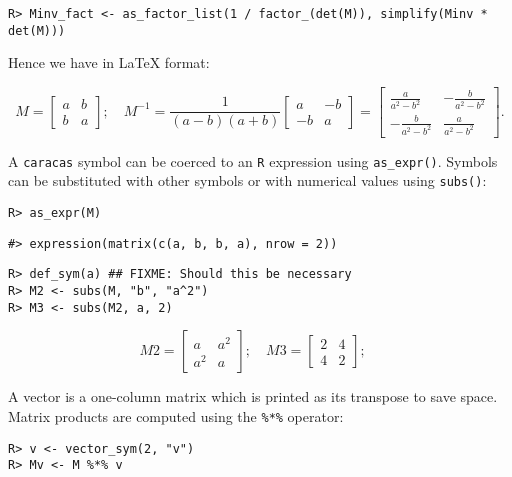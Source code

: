 \begin{verbatim}
R> Minv_fact <- as_factor_list(1 / factor_(det(M)), simplify(Minv * det(M)))
\end{verbatim}

Hence we have in LaTeX format:

\[
M = \left[\begin{matrix}a & b\\b & a\end{matrix}\right]; \quad M^{-1} = \frac{1}{\left(a - b\right) \left(a + b\right)}  \left[\begin{matrix}a & - b\\- b & a\end{matrix}\right] = \left[\begin{matrix}\frac{a}{a^{2} - b^{2}} & - \frac{b}{a^{2} - b^{2}}\\- \frac{b}{a^{2} - b^{2}} & \frac{a}{a^{2} - b^{2}}\end{matrix}\right] .
\]

A \texttt{caracas} symbol can be coerced to an \texttt{R} expression
using \texttt{as\_expr()}.
Symbols can be substituted with other symbols or with numerical values
using \texttt{subs()}:

\begin{verbatim}
R> as_expr(M)
\end{verbatim}

\begin{verbatim}
#> expression(matrix(c(a, b, b, a), nrow = 2))
\end{verbatim}

\begin{verbatim}
R> def_sym(a) ## FIXME: Should this be necessary
R> M2 <- subs(M, "b", "a^2")
R> M3 <- subs(M2, a, 2)
\end{verbatim}

\[
M2 = \left[\begin{matrix}a & a^{2}\\a^{2} & a\end{matrix}\right]; \quad
M3 = \left[\begin{matrix}2 & 4\\4 & 2\end{matrix}\right]; \quad
\]

A vector is a one-column matrix which is printed as its transpose to save space. Matrix products are computed using the \texttt{\%*\%} operator:

\begin{verbatim}
R> v <- vector_sym(2, "v")
R> Mv <- M %*% v
\end{verbatim}

